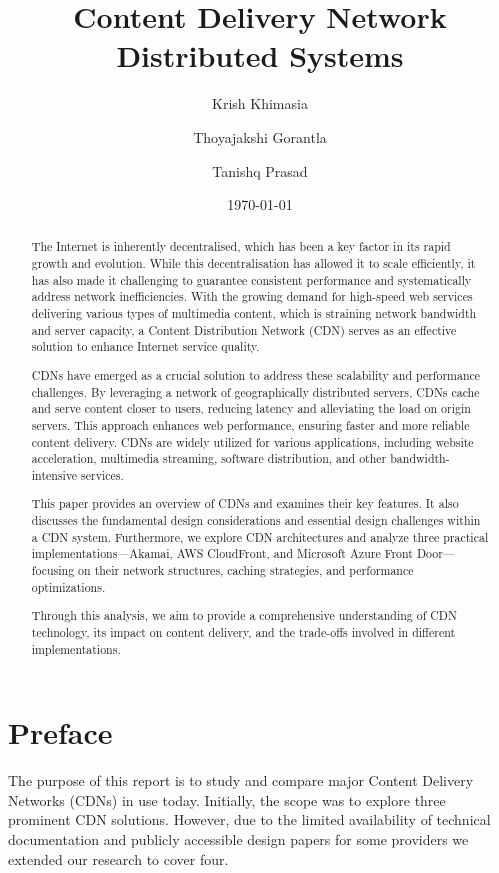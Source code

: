 \documentclass[12pt]{article}
\title{\textbf{Content Delivery Network}\\ \large Distributed Systems}
\author{Krish Khimasia \and Thoyajakshi Gorantla \and Tanishq Prasad}
\date{\today}
\begin{document}
\maketitle

\begin{abstract}
The Internet is inherently decentralised, which has been a key factor in its rapid growth
and evolution. While this decentralisation has allowed it to scale efficiently, it has also
made it challenging to guarantee consistent performance and systematically address
network inefficiencies. With the growing demand for high-speed web services delivering
various types of multimedia content, which is straining network bandwidth and server
capacity, a Content Distribution Network (CDN) serves as an effective solution to
enhance Internet service quality.

CDNs have emerged as a crucial solution to address these scalability and performance
challenges. By leveraging a network of geographically distributed servers, CDNs cache
and serve content closer to users, reducing latency and alleviating the load on origin
servers. This approach enhances web performance, ensuring faster and more reliable
content delivery. CDNs are widely utilized for various applications, including website
acceleration, multimedia streaming, software distribution, and other bandwidth-intensive
services.

This paper provides an overview of CDNs and examines their key features. It also
discusses the fundamental design considerations and essential design challenges
within a CDN system. Furthermore, we explore CDN architectures and analyze three
practical implementations—Akamai, AWS CloudFront, and Microsoft Azure Front
Door—focusing on their network structures, caching strategies, and performance
optimizations.

Through this analysis, we aim to provide a comprehensive understanding of CDN
technology, its impact on content delivery, and the trade-offs involved in different
implementations.
\end{abstract}

\clearpage
\section*{Preface}

The purpose of this report is to study and compare major Content Delivery Networks (CDNs) in use today. Initially, the scope was to explore three prominent CDN solutions. However, due to the limited availability of technical documentation and publicly accessible design papers for some providers we extended our research to cover four.
\end{document}
